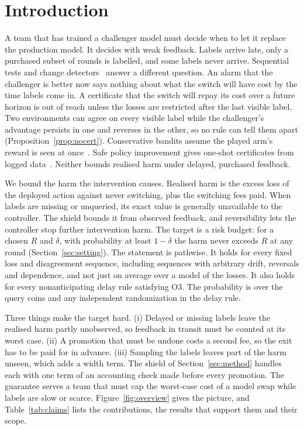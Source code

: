 \documentclass[10pt]{article}
\theoremstyle{plain}
\theoremstyle{definition}
\begin{document}
\section{Introduction}
A team that has trained a challenger model must decide when to let it replace the production model. It decides with weak feedback. Labels arrive late, only a purchased subset of rounds is labelled, and some labels never arrive.
Sequential tests and change detectors~\citep{johari2022always,podkopaev2022tracking} answer a different question. An alarm that the challenger is better now says nothing about what the switch will have cost by the time labels come in. A certificate that the switch will repay its cost over a future horizon is out of reach unless the losses are restricted after the last visible label. Two environments can agree on every visible label while the challenger's advantage persists in one and reverses in the other, so no rule can tell them apart (Proposition~\ref{prop:nocert}). Conservative bandits assume the played arm's reward is seen at once~\citep{wu2016conservative}. Safe policy improvement gives one-shot certificates from logged data~\citep{thomas2015hcpi}. Neither bounds realised harm under delayed, purchased feedback.

We bound the harm the intervention causes. Realised harm is the excess loss of the deployed action against never switching, plus the switching fees paid. When labels are missing or unqueried, its exact value is generally unavailable to the controller. The shield bounds it from observed feedback, and reversibility lets the controller stop further intervention harm.
The target is a risk budget: for a chosen $R$ and $\delta$, with probability at least $1-\delta$ the harm never exceeds $R$ at any round (Section~\ref{sec:setting}).
The statement is pathwise. It holds for every fixed loss and disagreement sequence, including sequences with arbitrary drift, reversals and dependence, and not just on average over a model of the losses. It also holds for every nonanticipating delay rule satisfying O3. The probability is over the query coins and any independent randomization in the delay rule.

Three things make the target hard. (i) Delayed or missing labels leave the realised harm partly unobserved, so feedback in transit must be counted at its worst case. (ii) A promotion that must be undone costs a second fee, so the exit has to be paid for in advance. (iii) Sampling the labels leaves part of the harm unseen, which adds a width term. The shield of Section~\ref{sec:method} handles each with one term of an accounting check made before every promotion. The guarantee serves a team that must cap the worst-case cost of a model swap while labels are slow or scarce. Figure~\ref{fig:overview} gives the picture, and Table~\ref{tab:claims} lists the contributions, the results that support them and their scope.
\end{document}
